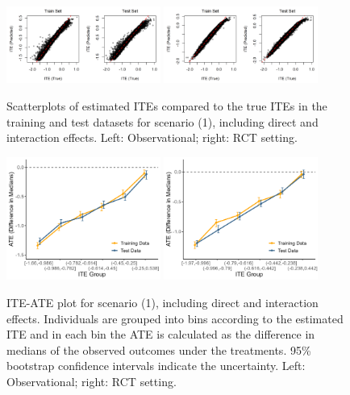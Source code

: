 \begin{figure}[htbp]
\centering
\includegraphics[width=0.45\textwidth]{img/results/observ_scenario1_ITE_scatter_train_test.png}
\includegraphics[width=0.45\textwidth]{img/results/rct_scenario1_ITE_scatter_train_test.png}
\caption{Scatterplots of estimated ITEs compared to the true ITEs in the training and test datasets for scenario (1), including direct and interaction effects. Left: Observational; right: RCT setting.}
\label{fig:scenario1_ite_scatter_train_test}
\end{figure}




\begin{figure}[htbp]
\centering
\includegraphics[width=0.45\textwidth]{img/results/observ_scenario1_ITE_cATE.png}
\includegraphics[width=0.45\textwidth]{img/results/rct_scenario1_ITE_cATE.png}
\caption{ITE-ATE plot for scenario (1), including direct and interaction effects. Individuals are grouped into bins according to the estimated ITE and in each bin the ATE is calculated as the difference in medians of the observed outcomes under the treatments. 95\% bootstrap confidence intervals indicate the uncertainty. Left: Observational; right: RCT setting.}
\label{fig:scenario1_ite_cATE}
\end{figure}



